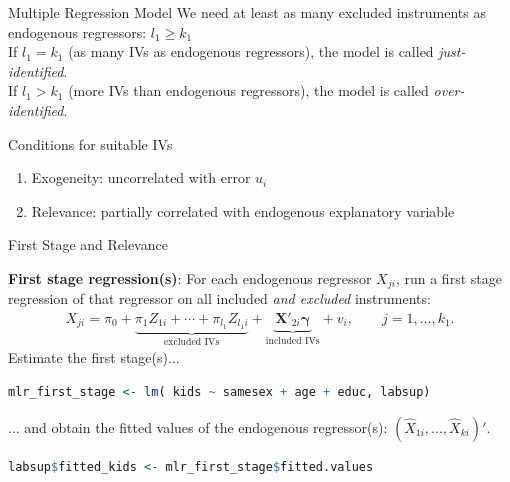 \documentclass[11pt, aspectratio = 169]{beamer}
\begin{document}
\begin{frame}{Multiple Regression Model}
We \alert{need at least as many excluded instruments as endogenous regressors: $l_1 \geq k_1$} \\
If {$l_1 = k_1$} (as many IVs as endogenous regressors), the model is called \textit{just-identified}. \\
If {$l_1  > k_1$} (more IVs than endogenous regressors), the model is called \textit{over-identified}.

\bigskip

\begin{block}{Conditions for suitable IVs}
\begin{enumerate}
    \item Exogeneity: uncorrelated with error  $u_i$
    \item Relevance: \alert{partially} correlated with endogenous explanatory variable
\end{enumerate}
\end{block}
\end{frame}

\begin{frame}[fragile]{First Stage and Relevance}

\textbf{First stage regression(s)}:  For each \alert{endogenous} regressor $X_{ji}$, run a first stage regression of that regressor on all included \alert{\emph{and excluded}} instruments:
\begin{align*}
X_{ji} 
    = \pi_0 
    + \underbrace{\pi_1 Z_{1i} + \cdots + \pi_{l_1} Z_{l_1 i}}_{\text{excluded IVs}} 
    + \underbrace{\boldsymbol{X}'_{2i}\boldsymbol{\gamma}}_{\text{included IVs}} 
    + v_i,
    \qquad j = 1, \ldots, k_1.
\end{align*}
\pause
Estimate the first stage(s)... 
\begin{lstlisting}[language=R]
    mlr_first_stage <- lm( kids ~ samesex + age + educ, labsup)
\end{lstlisting}
\pause
... and obtain the fitted values of the endogenous regressor(s): $(\hat{X}_{1i}, ..., \hat{X}_{ki})'$.
\begin{lstlisting}[language=R]
    labsup$fitted_kids <- mlr_first_stage$fitted.values
\end{lstlisting}

\end{frame}
\end{document}
